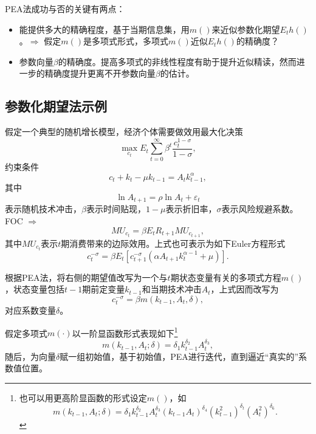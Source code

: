 PEA法成功与否的关键有两点：
\begin{itemize}
  \item 能提供多大的精确程度，基于当期信息集，用$m()$来近似参数化期望$E_t h()$。$\Rightarrow$ \cite{denHaan:1990bt}假定$m()$是多项式形式，多项式$m()$近似$E_t h()$的精确度？
  \item 参数向量$\beta$的精确度。提高多项式的非线性程度有助于提升近似精读，然而进一步的精确度提升更离不开参数向量$\beta$的估计。
\end{itemize}

\subsection{参数化期望法示例}
假定一个典型的随机增长模型，经济个体需要做效用最大化决策
\begin{equation*}
  \max_{c_t} E_t \sum_{t=0}^{\infty} \beta^{t} \frac{c_{t}^{1-\sigma}}{1-\sigma},
\end{equation*}
约束条件
\begin{equation}
  \label{eq:simple-pea-max-problem-budget-constraint}
  c_t + k_t - \mu k_{t-1} = A_t k_{t-1}^{\alpha},
\end{equation}
其中
\begin{equation*}
  \ln A_{t+1} = \rho \ln A_t + \varepsilon_t
\end{equation*}
表示随机技术冲击，$\beta$表示时间贴现，$1-\mu$表示折旧率，$\sigma$表示风险规避系数。FOC $\Rightarrow$
\begin{equation*}
  MU_{c_t} = \beta E_t R_{t+1} MU_{c_{t+1}},
\end{equation*}
其中$MU_{c_t}$表示$t$期消费带来的边际效用。上式也可表示为如下Euler方程形式
\begin{equation}
  \label{simple-pea-euler-eq}
  c_t^{-\sigma} = \beta E_t \left[c_{t+1}^{-\sigma} \left( \alpha A_{t+1} k_t^{\alpha -1} + \mu \right)\right].
\end{equation}

根据PEA法，将右侧的期望值改写为一个与$t$期状态变量有关的多项式方程$m()$，状态变量包括$t-1$期前定变量$k_{t-1}$和当期技术冲击$A_t$，上式因而改写为
\begin{equation}
  \label{eq:simple-pea-euler-consumption}
  c_t^{-\sigma} = \beta m(k_{t-1}, A_t, \delta),
\end{equation}
对应系数变量$\delta$。

假定多项式$m(\cdot)$以一阶显函数形式表现如下\footnote{也可以用更高阶显函数的形式设定$m()$，如\begin{equation*}
m(k_{t-1}, A_t; \delta) = \delta_1 k_{t-1}^{\delta_2} A_t^{\delta_3} \left( k_{t-1} A_t \right)^{\delta_4} \left( k_{t-1}^{2} \right)^{\delta_t} \left( A_t^2 \right)^{\delta_6}.
\end{equation*}}
\begin{equation}
  \label{eq:simple-pea-coeff-model}
  m(k_{t-1}, A_t; \delta) = \delta_1 k_{t-1}^{\delta_2} A_t^{\delta_3},
\end{equation}
随后，为向量$\delta$赋一组初始值，基于初始值，PEA进行迭代，直到逼近``真实的''系数值位置。

